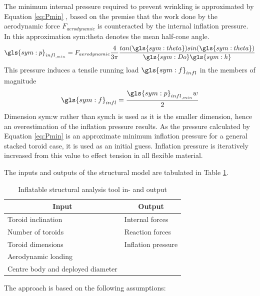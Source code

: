 The minimum internal pressure required to prevent wrinkling is approximated by Equation \ref{eq:Pmin} \cite{Brown2009, Samareh2011}, based on the premise that the work done by the aerodynamic force $F_{aerodynamic}$ is counteracted by the internal inflation pressure. In this approximation \gls{sym:theta} denotes the mean half-cone angle.
\begin{equation}
\label{eq:Pmin}
\gls{sym:p}_{{infl}_{,min}} = F_{aerodynamic} \frac{4}{3 \pi} \frac{tan(\gls{sym:theta})sin(\gls{sym:theta}) }{\gls{sym:Do}\gls{sym:h}}
\end{equation}
This pressure induces a tensile running load $\gls{sym:f}_{infl}$ in the members of magnitude \cite{Megson2012}
\begin{equation}
\label{eq:Q}
\gls{sym:f}_{infl} =\frac{\gls{sym:p}_{{infl}_{,min}}w}{2}
\end{equation}
Dimension \gls{sym:w} rather than \gls{sym:h} is used as it is the smaller dimension, hence an overestimation of the inflation pressure results. As the pressure calculated by Equation \ref{eq:Pmin} is an approximate minimum inflation pressure for a general stacked toroid case, it is used as an initial guess. Inflation pressure is iteratively increased from this value to effect tension in all flexible material.

The inputs and outputs of the structural model are tabulated in Table \ref{tab:infl}.
\begin{table}[h]
\caption{Inflatable structural analysis tool in- and output}
\centering
\begin{tabular}{|l||l|}
\hline
\multicolumn{1}{|c||}{{\bf Input}} & \multicolumn{1}{c|}{{\bf Output}} \\ \hline \hline
Toroid inclination                & Internal forces                   \\ \hline
Number of toroids                 & Reaction forces                   \\ \hline
Toroid dimensions                 & Inflation pressure                \\ \hline
Aerodynamic loading               &                                   \\ \hline
Centre body and deployed diameter  &                                   \\ \hline
\end{tabular}
\label{tab:infl}
\end{table}

The approach is based on the following assumptions:

